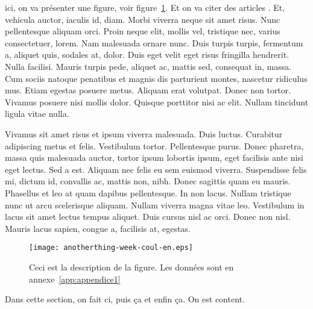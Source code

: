 \begin{contenu}

  ici, on va présenter une figure, voir figure~\ref{fig-tool}. Et on va citer
  des articles \cite{torproject, churnMagnienBenamara, cholez2010,
  wikipediaedonkey, edonkey, blecic98, hancock90}. Et, vehicula auctor, iaculis
  id, diam. Morbi viverra neque sit amet risus. Nunc pellentesque aliquam orci.
  Proin neque elit, mollis vel, tristique nec, varius consectetuer, lorem. Nam
  malesuada ornare nunc. Duis turpis turpis, fermentum a, aliquet quis, sodales
  at, dolor. Duis eget velit eget risus fringilla hendrerit. Nulla facilisi.
  Mauris turpis pede, aliquet ac, mattis sed, consequat in, massa. Cum sociis
  natoque penatibus et magnis dis parturient montes, nascetur ridiculus mus.
  Etiam egestas posuere metus. Aliquam erat volutpat. Donec non tortor. Vivamus
  posuere nisi mollis dolor. Quisque porttitor nisi ac elit. Nullam tincidunt
  ligula vitae nulla. 

  \begin{brouillon}
  Vivamus sit amet risus et ipsum viverra malesuada. Duis
  luctus. Curabitur adipiscing metus et felis. Vestibulum tortor. Pellentesque
  purus. Donec pharetra, massa quis malesuada auctor, tortor ipsum lobortis
  ipsum, eget facilisis ante nisi eget lectus. Sed a est. Aliquam nec felis eu
  sem euismod viverra. Suspendisse felis mi, dictum id, convallis ac, mattis
  non, nibh. Donec sagittis quam eu mauris. Phasellus et leo at quam dapibus
  pellentesque. In non lacus. Nullam tristique nunc ut arcu scelerisque aliquam.
  Nullam viverra magna vitae leo. Vestibulum in lacus sit amet lectus tempus
  aliquet. Duis cursus nisl ac orci. Donec non nisl. Mauris lacus sapien, congue
  a, facilisis at, egestas.
  \end{brouillon}


\begin{figure}[!ht]
\centering
\texttt{[image: anotherthing-week-coul-en.eps]}
\caption[Figure bidule]{Ceci est la description de la figure. Les données sont
en annexe~\ref{app:appendice1}} 
\label{fig-tool}
\end{figure}

\end{contenu}

\begin{encadre}
  Dans cette section, on fait ci, puis ça et enfin ça. On est content.
\end{encadre}

